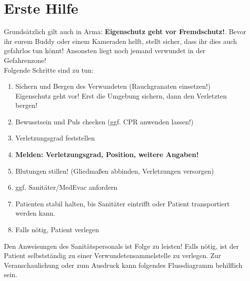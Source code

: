 \pagebreak
\section{Erste Hilfe}
Grundsätzlich gilt auch in Arma: \textbf{Eigenschutz geht vor Fremdschutz!}. Bevor ihr eurem Buddy oder einem Kameraden helft, stellt sicher, dass ihr dies auch gefahrlos tun könnt! Ansonsten liegt noch jemand verwundet in der Gefahrenzone!\\
Folgende Schritte sind zu tun:
\begin{enumerate}
	\item Sichern und Bergen des Verwundeten (Rauchgranaten einsetzen!)\\
			Eigenschutz geht vor! Erst die Umgebung sichern, dann den Verletzten bergen! 
	\item Bewusstsein und Puls checken (ggf. CPR anwenden lassen!)
	\item Verletzungsgrad feststellen
	\item \textbf{Melden: Verletzungsgrad, Position, weitere Angaben!}
	\item Blutungen stillen! (Gliedmaßen abbinden, Verletzungen versorgen)
	\item ggf. Sanitäter/MedEvac anfordern
	\item Patienten stabil halten, bis Sanitäter eintrifft oder Patient transportiert werden kann.
	\item Falls nötig, Patient verlegen
\end{enumerate}
Den Anweisungen des Sanitätspersonals ist Folge zu leisten! Falls nötig, ist der Patient selbstständig zu einer Verwundetensammelstelle zu verlegen.
Zur Veranschaulichung oder zum Ausdruck kann folgendes Flussdiagramm behilflich sein.

